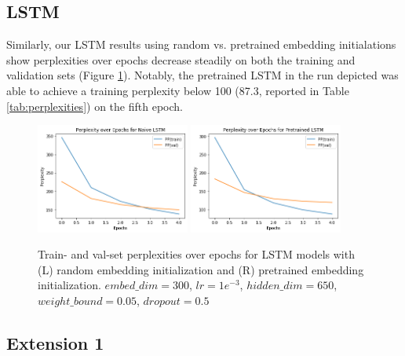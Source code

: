 \documentclass[11pt]{article}
\begin{document}
\subsection{LSTM}

Similarly, our LSTM results using random vs. pretrained embedding initialations show perplexities over epochs decrease steadily on both the training and validation sets (Figure \ref{fig:lstm-pps}). Notably, the pretrained LSTM in the run depicted was able to achieve a training perplexity below 100 (87.3, reported in Table \ref{tab:perplexities}) on the fifth epoch.

\begin{figure}
  \centering
  \includegraphics[width=0.45\textwidth]{figures/lstm_naive_pp.png}
  \includegraphics[width=0.45\textwidth]{figures/lstm_pretrained_pp.png}
  \caption{Train- and val-set perplexities over epochs for LSTM models with (L) random embedding initialization and (R) pretrained embedding initialization. $embed\_dim=300$, $lr=1e^{-3}$, $hidden\_dim=650$, $weight\_bound=0.05$, $dropout=0.5$}
  \label{fig:lstm-pps}
\end{figure}

\subsection{Extension 1}
\end{document}
